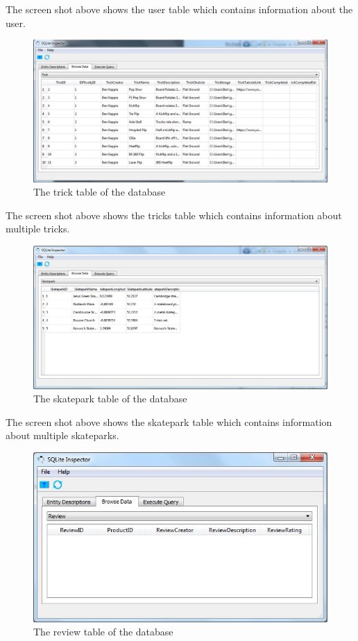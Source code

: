 The screen shot above shows the user table which contains information about the user.

\begin{figure}[H]
    \includegraphics[width=\textwidth]{./Maintenance/Figures/TrickTable.jpg}
    \caption{The trick table of the database} \label{fig:Trick Table}
\end{figure}

The screen shot above shows the tricks table which contains information about multiple tricks.


\begin{figure}[H]
    \includegraphics[width=\textwidth]{./Maintenance/Figures/SkateparkTable.jpg}
    \caption{The skatepark table of the database} \label{fig:Skatepark Table}
\end{figure}

The screen shot above shows the skatepark table which contains information about multiple skateparks.

\begin{figure}[H]
    \includegraphics[width=\textwidth]{./Maintenance/Figures/ReviewTable.jpg}
    \caption{The review table of the database} \label{fig:Review Table}
\end{figure}

